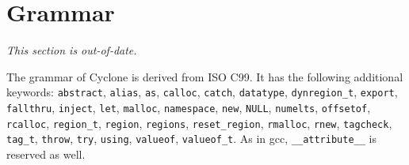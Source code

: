 \section{Grammar}

\emph{This section is out-of-date.}

\newcommand{\rulelabel}[1]{%
  \parbox[b]{\labelwidth}{\makebox[0pt][l]{\hypertarget{#1}{\textit{#1}}:}}}
\newcommand{\ruleoneoflabel}[1]{%
  \parbox[b]{\labelwidth}%
  {\makebox[0pt][l]{\hypertarget{#1}{\textit{#1}}: one of}}}
\newenvironment{rules}[1]{%
  \begin{list}{}{}%
    \renewcommand{\makelabel}{\rulelabel}%
  \item[#1]\mbox{}\\}{\end{list}}
\newenvironment{rulesoneof}[1]{%
  \begin{list}{}{}%
    \renewcommand{\makelabel}{\ruleoneoflabel}%
  \item[#1]\mbox{}\\}{\end{list}}

\newcommand{\nt}[1]{\hyperlink{#1}{\textit{#1}}} %
\newcommand{\tk}[1]{\texttt{#1}}                 %
\newcommand{\opt}{\ensuremath{_{\it\textcolor{bluegray}{opt}}}}

The grammar of Cyclone is derived from ISO C99.
It has the following additional keywords:
\texttt{abstract},
\texttt{alias},
\texttt{as},
\texttt{calloc},
\texttt{catch},
\texttt{datatype},
\texttt{dynregion_t},
\texttt{export},
\texttt{fallthru},
\texttt{inject},
\texttt{let},
\texttt{malloc},
\texttt{namespace},
\texttt{new},
\texttt{NULL},
\texttt{numelts},
\texttt{offsetof},
\texttt{rcalloc},
\texttt{region_t},
\texttt{region},
\texttt{regions},
\texttt{reset_region},
\texttt{rmalloc},
\texttt{rnew},
\texttt{tagcheck},
\texttt{tag_t},
\texttt{throw},
\texttt{try},
\texttt{using},
\texttt{valueof},
\texttt{valueof_t}.
As in gcc,
\texttt{__attribute__}
is reserved as well.

